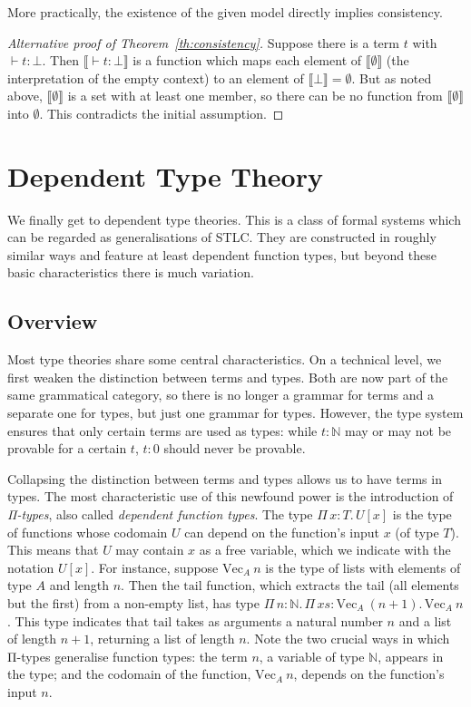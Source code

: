 \documentclass{scrartcl}
\theoremstyle{definition}
\newcommand{\PiT}[2]{Π\,#1.\, #2}
\renewcommand{\Vec}{\ensuremath{\mathrm{Vec}}}
\newcommand{\tail}{\ensuremath{\mathrm{tail}}}
\begin{document}
More practically, the existence of the given model directly implies consistency.

\begin{proof}[Alternative proof of Theorem~\ref{th:consistency}]
  Suppose there is a term $t$ with $⊢ t : ⊥$.
  Then $⟦⊢ t : ⊥⟧$ is a function which maps each element of $⟦∅⟧$ (the interpretation of the empty context) to an element of $⟦⊥⟧ = ∅$.
  But as noted above, $⟦∅⟧$ is a set with at least one member, so there can be no function from $⟦∅⟧$ into $∅$.
  This contradicts the initial assumption.
\end{proof}

\section{Dependent Type Theory}

We finally get to dependent type theories.
This is a class of formal systems which can be regarded as generalisations of STLC.\@
They are constructed in roughly similar ways and feature at least dependent function types, but beyond these basic characteristics there is much variation.

\subsection{Overview}

Most type theories share some central characteristics.
On a technical level, we first weaken the distinction between terms and types.
Both are now part of the same grammatical category, so there is no longer a grammar for terms and a separate one for types, but just one grammar for types.
However, the type system ensures that only certain terms are used as types: while $t : ℕ$ may or may not be provable for a certain $t$, $t : 0$ should never be provable.

Collapsing the distinction between terms and types allows us to have terms in types.
The most characteristic use of this newfound power is the introduction of \emph{Π-types}, also called \emph{dependent function types}.
The type $\PiT{x : T}{U[x]}$ is the type of functions whose codomain $U$ can depend on the function's input $x$ (of type $T$).
This means that $U$ may contain $x$ as a free variable, which we indicate with the notation $U[x]$.
For instance, suppose $\Vec_{A}~n$ is the type of lists with elements of type $A$ and length $n$.
Then the $\tail$ function, which extracts the tail (all elements but the first) from a non-empty list, has type $\PiT{n : ℕ}{\PiT{xs : \Vec_{A}~(n + 1)}{\Vec_{A}~n}}$.
This type indicates that $\tail$ takes as arguments a natural number $n$ and a list of length $n + 1$, returning a list of length $n$.
Note the two crucial ways in which Π-types generalise function types: the term $n$, a variable of type $ℕ$, appears in the type; and the codomain of the function, $\Vec_{A}~n$, depends on the function's input $n$.
\end{document}
